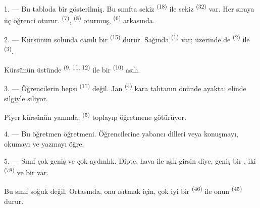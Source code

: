 \VUsaut{2.0mm}
\VUsaut{3.2mm}
\VUsaut{2.6mm}
\VUsaut{3.4mm}
\VUornamento{9pt}
\VUsaut{5.0mm}
\VUsaut{3.0mm}
\VUfilet{16mm}
\VUsaut{5.6mm}

\VUsaut{1.4mm}
\VUsaut{2.2mm}
\VUfilet{20mm}
\VUsaut{6.4mm}

\VUsaut{3.0mm}

1. --- Bu tabloda bir   gösterilmiş. Bu sınıfta
sekiz  \textsuperscript{(18)} ile sekiz 
\textsuperscript{(32)} var. Her sıraya üç öğrenci oturur. 
\textsuperscript{(7)},  \textsuperscript{(8)} oturmuş,
 \textsuperscript{(6)} arkasında.

2. --- Kürsünün solunda camlı bir  \textsuperscript{(15)} durur.
Sağında  \textsuperscript{(1)} var; üzerinde de
 \textsuperscript{(2)} ile 
\textsuperscript{(3)}.

Kürsünün üstünde  \textsuperscript{(9, 11, 12)} ile bir
 \textsuperscript{(10)} asılı.

3. --- Öğrencilerin hepsi  \textsuperscript{(17)} değil. Jan
\textsuperscript{(4)} kara tahtanın önünde ayakta; elinde silgiyle
 siliyor.

Piyer kürsünün yanında;  \textsuperscript{(5)}
toplayıp öğretmene götürüyor.

4. --- Bu öğretmen  öğretmeni. Öğrencilerine yabancı
dilleri  veya
 konuşmayı, okumayı ve yazmayı öğre.

5. --- Sınıf çok geniş ve çok aydınlık. Dipte, hava ile ışık girsin diye,
geniş bir , iki  \textsuperscript{(78)} ve bir
 var.

Bu sınıf soğuk değil. Ortasında, onu ısıtmak için, çok iyi bir
 \textsuperscript{(46)} ile onun 
\textsuperscript{(45)} durur.

